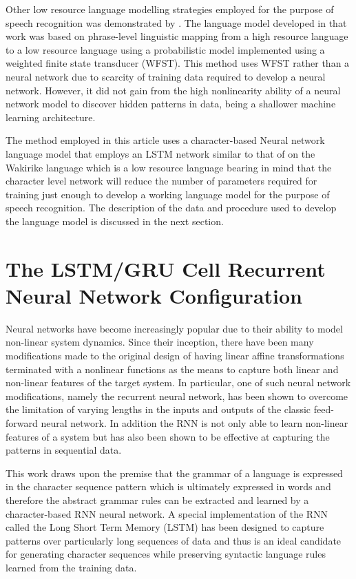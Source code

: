 \documentclass[a4paper]{article}
\begin{document}
Other low resource language modelling strategies employed for the purpose of speech recognition was demonstrated by \cite{xu2013cross}.  The language model developed in that work was based on phrase-level linguistic mapping from a high resource language to a low resource language using a probabilistic model implemented using a weighted finite state transducer (WFST). This method uses WFST rather than a neural network due to scarcity of training data required to develop a neural network. However, it did not gain from the high nonlinearity ability of a neural network model to discover hidden patterns in data, being a shallower machine learning architecture.

The method employed in this article uses a character-based Neural network language model that employs an LSTM network similar to that of \cite{kim2016character} on the Wakirike language which is a low resource language bearing in mind that the character level network will reduce the number of parameters required for training just enough to develop a working language model for the purpose of speech recognition.  The description of the data and procedure used to develop the language model is discussed in the next section. 

\section{The LSTM/GRU Cell Recurrent Neural Network Configuration}


Neural networks have become increasingly popular due to their ability to model non-linear system dynamics. Since their inception, there have been many modifications made to the original design of having linear affine transformations terminated with a nonlinear functions as the means to capture both linear and non-linear features of the target system. In particular, one of such neural network  modifications, namely the recurrent neural network, has been shown to overcome the limitation of varying lengths in the inputs and outputs of the classic feed-forward neural network.  In addition the RNN is not only able to learn non-linear features of a system but has also been shown to be effective at capturing the patterns in sequential data.

This work draws upon the premise that the grammar of a language is expressed in the character sequence pattern which is ultimately expressed in words and therefore the abstract grammar rules can be extracted and learned by a character-based RNN neural network.  A special implementation of the RNN called the Long Short Term Memory (LSTM) has been designed to capture patterns over particularly long sequences of data and thus is an ideal candidate for generating character sequences while preserving syntactic language rules learned from the training data.
\end{document}
